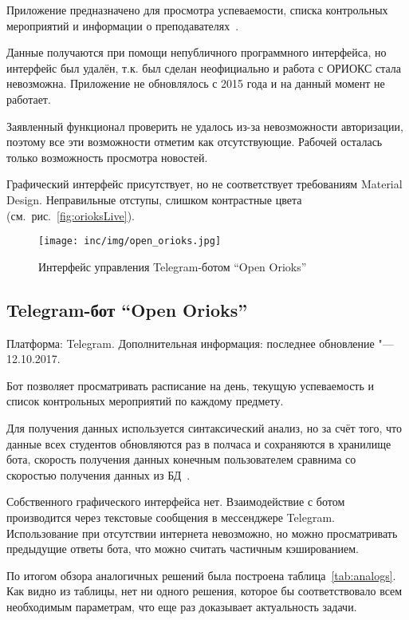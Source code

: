 Приложение предназначено для просмотра успеваемости, списка контрольных мероприятий и информации о преподавателях~\cite{market:orioksLive}.

Данные получаются при помощи непубличного программного интерфейса, но интерфейс был удалён, т.к. был сделан неофициально и работа с ОРИОКС стала невозможна.
Приложение не обновлялось с 2015 года и на данный момент не работает.

Заявленный функционал проверить не удалось из-за невозможности авторизации, поэтому все эти возможности отметим как отсутствующие.
Рабочей осталась только возможность просмотра новостей.

Графический интерфейс присутствует, но не соответствует требованиям Material Design.
Неправильные отступы, слишком контрастные цвета (см.~рис.~\ref{fig:orioksLive}).

\begin{figure}[ht]
  \centering
  \texttt{[image: inc/img/open\_orioks.jpg]}
  \caption{Интерфейс управления Telegram-ботом ``Open Orioks''}
  \label{fig:openOrioks}
\end{figure}

\subsection{Telegram-бот ``Open Orioks''}
\label{subsec:botOpenOrioks}
Платформа: Telegram.
Дополнительная информация: последнее обновление "--- 12.10.2017.

Бот позволяет просматривать расписание на день, текущую успеваемость и список контрольных мероприятий по каждому предмету.

Для получения данных используется синтаксический анализ, но за счёт того, что данные всех студентов обновляются раз в полчаса и сохраняются в хранилище бота, скорость получения данных конечным пользователем сравнима со скоростью получения данных из БД~\cite{github:openOrioks}.

Собственного графического интерфейса нет.
Взаимодействие с ботом производится через текстовые сообщения в мессенджере Telegram.
Использование при отсутствии интернета невозможно, но можно просматривать предыдущие ответы бота, что можно считать частичным кэшированием.

По итогом обзора аналогичных решений была построена таблица~\ref{tab:analogs}.
Как видно из таблицы, нет ни одного решения, которое бы соответствовало всем необходимым параметрам, что еще раз доказывает актуальность задачи.

